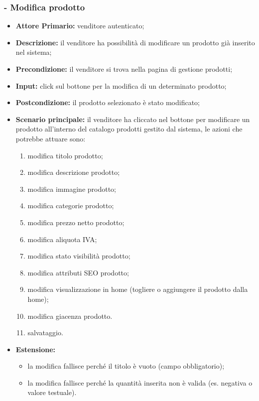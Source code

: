 \stepsubUserCase
\subsubsection{- Modifica  prodotto}
\begin{itemize}
    \item \textbf{Attore Primario:} venditore autenticato;
    \item \textbf{Descrizione:} il venditore ha possibilità di modificare un prodotto già inserito nel sistema;
    \item \textbf{Precondizione:} il venditore si trova nella pagina di gestione prodotti;
    \item \textbf{Input:} click sul bottone per la modifica di un determinato prodotto;
    \item \textbf{Postcondizione:} il prodotto selezionato è stato modificato;
    \item \textbf{Scenario principale:} il venditore ha cliccato nel bottone per modificare un prodotto all’interno del catalogo prodotti gestito dal sistema, le azioni che potrebbe attuare sono:
          \begin{enumerate}
              \item modifica titolo prodotto;
              \item modifica descrizione prodotto;
              \item modifica immagine prodotto;
              \item modifica categorie prodotto;
              \item modifica prezzo netto prodotto;
              \item modifica aliquota IVA;
              \item modifica stato visibilità prodotto;
              \item modifica attributi SEO prodotto;
              \item modifica visualizzazione in home (togliere o aggiungere il prodotto dalla home);
              \item modifica giacenza prodotto.
              \item salvataggio.
          \end{enumerate}
    \item \textbf{Estensione:}
          \begin{itemize}
              \item la modifica fallisce perché il titolo è vuoto (campo obbligatorio);
              \item la modifica fallisce perché la quantità inserita non è valida (es. negativa o valore testuale).
          \end{itemize}
\end{itemize}


